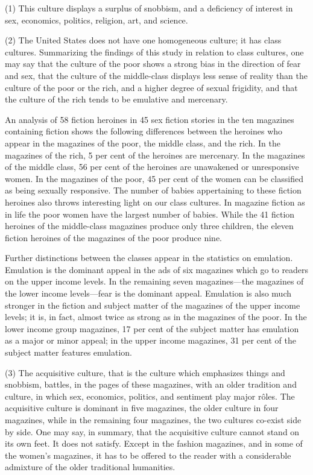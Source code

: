\documentclass[twoside,nohyper,openany,nobib]{tufte-book}
\begin{document}
(1) This culture displays a surplus of snobbism, and a deficiency of
interest in sex, economics, politics, religion, art, and science.

(2) The United States does not have one homogeneous culture; it has
class cultures. Summarizing the findings of this study in relation to
class cultures, one may say that the culture of the poor shows a strong
bias in the direction of fear and sex, that the culture of the
middle-class displays less sense of reality than the culture of the poor
or the rich, and a higher degree of sexual frigidity, and that the
culture of the rich tends to be emulative and mercenary.

An analysis of 58 fiction heroines in 45 sex fiction stories in the ten
magazines containing fiction shows the following differences between the
heroines who appear in the magazines of the poor, the middle class, and
the rich. In the magazines of the rich, 5 per cent of the heroines are
mercenary. In the magazines of the middle class, 56 per cent of the
heroines are unawakened or unresponsive women. In the magazines of the
poor, 45 per cent of the women can be classified as being sexually
responsive. The number of babies appertaining to these fiction heroines
also throws interesting light on our class cultures. In magazine fiction
as in life the poor women have the largest number of babies. While the
41 fiction heroines of the middle-class magazines produce only three
children, the eleven fiction heroines of the magazines of the poor
produce nine.

Further distinctions between the classes appear in the statistics on
emulation. Emulation is the dominant appeal in the ads of six magazines
which go to readers on the upper income levels. In the remaining seven
magazines---the magazines of the lower income levels---fear is the
dominant appeal. Emulation is also much stronger in the fiction and
subject matter of the magazines of the upper income levels; it is, in
fact, almost twice as strong as in the magazines of the poor. In the
lower income group magazines, 17 per cent of the subject matter has
emulation as a major or minor appeal; in the upper income magazines, 31
per cent of the subject matter features emulation.

(3) The acquisitive culture, that is the culture which emphasizes things
and snobbism, battles, in the pages of these magazines, with an older
tradition and culture, in which sex, economics, politics, and sentiment
play major r\^oles. The acquisitive culture is dominant in five magazines,
the older culture in four magazines, while in the remaining four
magazines, the two cultures co-exist side by side. One may say, in
summary, that the acquisitive culture cannot stand on its own feet. It
does not satisfy. Except in the fashion magazines, and in some of the
women's magazines, it has to be offered to the reader with a
considerable admixture of the older traditional humanities.
\end{document}

